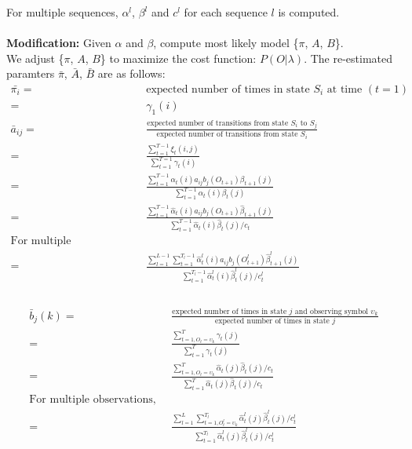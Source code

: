\documentclass[english]{article}
\begin{document}
For multiple sequences, $\alpha^l$, $\beta^l$ and $c^l$ for each sequence $l$ is computed.  \\ \\
\textbf{Modification:} 
Given $\alpha$ and $\beta$, compute most likely model \{$\pi$, $A$, $B$\}.
\\ We adjust \{$\pi$, $A$, $B$\} to maximize the cost function: $P(O|\lambda)$. The re-estimated paramters {$\bar{\pi}$, $\bar{A}$, $\bar{B}$} are as follows:
\begin{align*}
	\bar{\pi_i} =&\; \text{expected number of times in state } S_i \text{ at time } (t = 1)  \\
	=&\; \gamma_1(i) \\
	\bar{a}_{ij} =&\; \frac{\text{expected number of transitions from state }S_i \text{ to } S_j}{\text{expected number of transitions from state }S_i} \\
	=&\; \frac{\sum_{t=1}^{T-1} \xi_t(i,j)}{\sum_{t=1}^{T=1}\gamma_t(i)} \\
	=&\; \frac{\sum_{t=1}^{T-1} \alpha_t(i) a_{ij} b_{j}(O_{t+1}) \beta_{t+1}(j)}{\sum_{t=1}^{T-1} \alpha_t(i) \beta_{t}(j) } \\
	=&\; \frac{\sum_{t=1}^{T-1} \hat{\alpha}_t(i) a_{ij} b_{j}(O_{t+1}) \hat{\beta}_{t+1}(j)}{\sum_{t=1}^{T-1} \hat{\alpha}_t(i) \hat{\beta}_{t}(j) / c_t } \\
	\text{For multiple observations, }\\
	=&\; \frac{\sum_{l=1}^{L-1} \sum_{t=1}^{T_l-1} \hat{\alpha}_t^{l}(i) a_{ij} b_{j}(O_{t+1}^{l}) \hat{\beta}_{t+1}^{l}(j)}{\sum_{t=1}^{T_l-1} \hat{\alpha}_t^{l}(i) \hat{\beta}_{t}^{l}(j) / c_t^{l} }\\ \\
\end{align*}

\begin{align*}
	\bar{b}_j(k) =&\; \frac{\text{expected number of times in state } j \text{ and observing symbol }\upsilon_k}{\text{expected number of times in state }j} \\
	=&\; \frac{\sum_{t=1, O_t=\upsilon_k}^{T} \gamma_t(j)}{\sum_{t=1}^{T} \gamma_t(j)} \\
	=&\; \frac{\sum_{t=1, O_t=\upsilon_k}^{T} \hat{\alpha}_t(j) \hat{\beta}_t(j) / c_t}{\sum_{t=1}^{T} \hat{\alpha}_t(j) \hat{\beta}_t(j) / c_t} \\
	\text{For multiple observations, } \\
	=&\;  \frac{\sum_{l=1}^{L} \sum_{t=1, O_t^{l}=\upsilon_k}^{T_l} \hat{\alpha}_t^{l}(j) \hat{\beta}_t^{l}(j) / c_t^{l}}{\sum_{t=1}^{T_l} \hat{\alpha}_t^{l}(j) \hat{\beta}_t^{l}(j) / c_t^{l}} \\
\end{align*}
\end{document}
